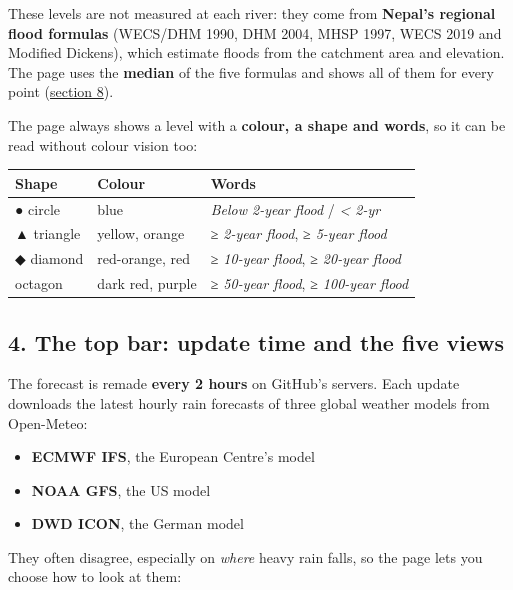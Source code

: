 \documentclass[
  10pt,
]{article}
\providecommand{\tightlist}{%
  \setlength{\itemsep}{0pt}\setlength{\parskip}{0pt}}
\begin{document}
These levels are not measured at each river: they come from
\textbf{Nepal's regional flood formulas} (WECS/DHM 1990, DHM 2004, MHSP
1997, WECS 2019 and Modified Dickens), which estimate floods from the
catchment area and elevation. The page uses the \textbf{median} of the
five formulas and shows all of them for every point
(\protect\hyperlink{design-floods-by-method}{section 8}).

The page always shows a level with a \textbf{colour, a shape and words},
so it can be read without colour vision too:

\begin{longtable}[]{@{}lll@{}}
\toprule
Shape & Colour & Words\tabularnewline
\midrule
\endhead
● circle & blue & \emph{Below 2-year flood} / \emph{\textless{}
2-yr}\tabularnewline
▲ triangle & yellow, orange & \emph{≥ 2-year flood}, \emph{≥ 5-year
flood}\tabularnewline
◆ diamond & red-orange, red & \emph{≥ 10-year flood}, \emph{≥ 20-year
flood}\tabularnewline
octagon & dark red, purple & \emph{≥ 50-year flood}, \emph{≥ 100-year
flood}\tabularnewline
\bottomrule
\end{longtable}

\hypertarget{the-top-bar-update-time-and-the-five-views}{%
\subsection{4. The top bar: update time and the five
views}\label{the-top-bar-update-time-and-the-five-views}}

The forecast is remade \textbf{every 2 hours} on GitHub's servers. Each
update downloads the latest hourly rain forecasts of three global
weather models from Open-Meteo:

\begin{itemize}
\tightlist
\item
  \textbf{ECMWF IFS}, the European Centre's model
\item
  \textbf{NOAA GFS}, the US model
\item
  \textbf{DWD ICON}, the German model
\end{itemize}

They often disagree, especially on \emph{where} heavy rain falls, so the
page lets you choose how to look at them:
\end{document}
